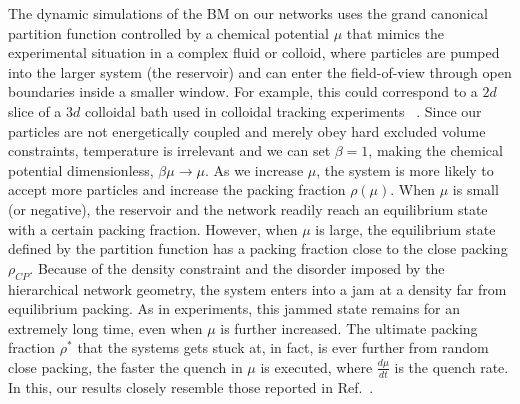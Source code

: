 \label{subsec:jamsc} The dynamic simulations of the BM on our networks
uses the grand canonical partition function controlled by a chemical
potential $\mu$ that mimics the experimental situation in a complex
fluid or colloid, where particles are pumped into the larger system
(the reservoir) and can enter the field-of-view through open boundaries
inside a smaller window. For example, this could correspond to a $2d$
slice of a $3d$ colloidal bath used in colloidal tracking experiments
~\cite{Hunter12}. Since our particles are not energetically coupled
and merely obey hard excluded volume constraints, temperature is irrelevant
and we can set $\beta=1$, making the chemical potential dimensionless,
$\beta\mu\to\mu$. As we increase $\mu$, the system is more likely
to accept more particles and increase the packing fraction $\rho(\mu)$.
When $\mu$ is small (or negative), the reservoir and the network
readily reach an equilibrium state with a certain packing fraction.
However, when $\mu$ is large, the equilibrium state defined by the
partition function has a packing fraction close to the close packing
$\rho_{CP}$. Because of the density constraint and the disorder imposed
by the hierarchical network geometry, the system enters into a jam
at a density far from equilibrium packing. As in experiments, this
jammed state remains for an extremely long time, even when $\mu$
is further increased. The ultimate packing fraction $\rho^{*}$ that
the systems gets stuck at, in fact, is ever further from random close
packing, the faster the quench in $\mu$ is executed, where $\frac{d\mu}{dt}$
is the quench rate. In this, our results closely resemble those reported
in Ref.~\cite{Krzakala2008}. 

